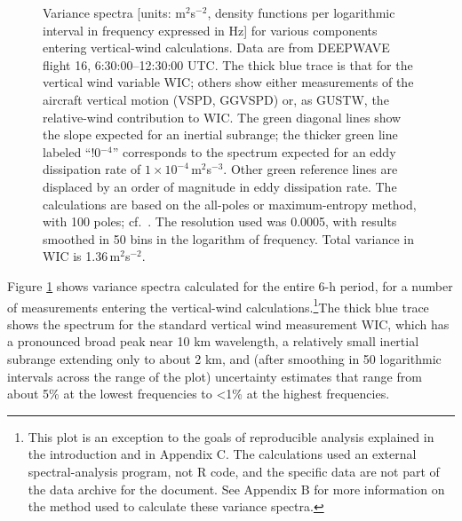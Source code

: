 \documentclass[12pt,twoside,english]{article}\usepackage[]{graphicx}\usepackage[]{color}
\let\OrgIndex\index
\renewcommand*{\index}[1]{\OrgIndex{#1}}
\begin{document}
{{\begin{figure}
\protect\caption[Variance spectra for various components entering vertical-wind calculations.]{\label{fig:Variance-spectra-VSPD}Variance spectra {[}units: m$^{2}$s$^{-2}$, density functions per logarithmic interval in frequency expressed in Hz{]} for various components entering vertical-wind calculations. Data are from DEEPWAVE flight 16, 6:30:00--12:30:00 UTC. The thick blue trace is that for the vertical wind variable WIC; others show either measurements of the aircraft vertical motion (VSPD, GGVSPD) or, as GUSTW, the relative-wind contribution to WIC. The green diagonal lines show the slope expected for an inertial subrange; the thicker green line labeled ``!0$^{-4}$'' corresponds to the spectrum expected for an eddy dissipation rate of $1\times10^{-4}$\,m$^{2}$s$^{-3}$. Other green reference lines are displaced by an order of magnitude in eddy dissipation rate. The calculations are based on the all-poles or maximum-entropy method, with 100 poles; cf.~\citet{Press:1992:NRC:148286}. The resolution used was 0.0005, with results smoothed in 50 bins in the logarithm of frequency. Total variance in WIC is 1.36\,m$^{2}$s$^{-2}$.} 
\end{figure}

Figure \ref{fig:Variance-spectra-VSPD} shows variance spectra calculated for the entire 6-h period, for a number of measurements entering the vertical-wind calculations.\footnote{This plot is an exception to the goals of \textquotedbl{}reproducible analysis\textquotedbl{} explained in the introduction and in Appendix C. The calculations used an external spectral-analysis program, not R code, and the specific data are not part of the data archive for the document. See Appendix B for more information on the method used to calculate these variance spectra.}The thick blue trace shows the spectrum for the standard vertical wind measurement WIC, which has a pronounced broad peak near 10 km wavelength, a relatively small inertial subrange extending only to about 2 km, and (after smoothing in 50 logarithmic intervals across the range of the plot) uncertainty estimates that range from about 5\% at the lowest frequencies to <1\% at the highest frequencies. 

}}
\end{document}
